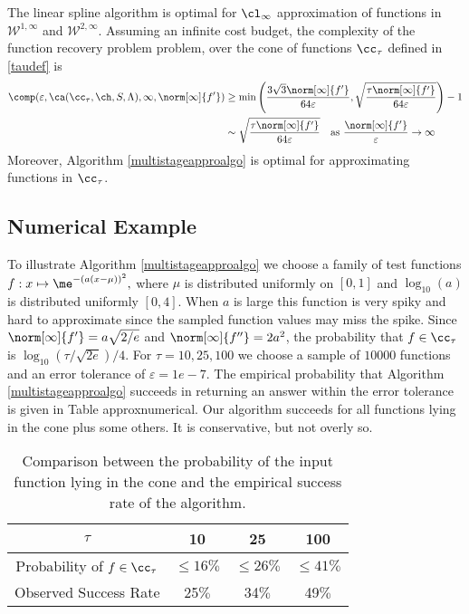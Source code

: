 \begin{theorem} \label{complowbdappr} The linear spline algorithm is optimal for $\cl_{\infty}$ approximation of functions in $\mathcal{W}^{1,\infty}$ and $\mathcal{W}^{2,\infty}$. Assuming an infinite cost budget, the complexity of the function recovery problem problem, over the cone of functions $\cc_{\tau}$ defined in \eqref{taudef} is
\begin{align*}
\comp(\varepsilon,\ca(\cc_{\tau},\ch,S,\Lambda),\infty,\norm[\infty]{f'})
&\ge \min\left(\frac{3\sqrt{3}\norm[\infty]{f'}}{64 \varepsilon}, \sqrt{\frac{\tau\norm[\infty]{f'}}{64\varepsilon}} \right)-1\\
& \sim \sqrt{\frac{\tau\norm[\infty]{f'}}{64\varepsilon}}  \quad\text{as } \frac{\norm[\infty]{f'}}{\varepsilon} \to \infty
\end{align*}
Moreover, Algorithm \ref{multistageapproalgo} is optimal for approximating functions in $\cc_{\tau}$.
\end{theorem}

\subsection{Numerical Example}

To illustrate Algorithm \ref{multistageapproalgo} we
choose a family of test functions $f:x \mapsto \me^{-(a(x-\mu))^2},$
where $\mu$ is distributed uniformly on $[0,1]$ and $\log_{10}(a)$ is distributed uniformly $[0,4]$.  When $a$ is large this function is very spiky and hard to approximate since the sampled function values may miss the spike.  Since $\norm[\infty]{f'}=a\sqrt{2/e}$ and $\norm[\infty]{f''}=2a^2$, the probability that $f \in \cc_{\tau}$ is $\log_{10}(\tau/\sqrt{2e})/4.$
For $\tau = 10, 25 , 100$ we choose a sample of  $10000$ functions and an error tolerance of  $\varepsilon = 1e-7$.  The empirical probability that Algorithm \ref{multistageapproalgo} succeeds in returning an answer within the error tolerance is given in Table {approxnumerical}.  Our algorithm succeeds for all functions lying in the cone plus some others.  It is conservative, but not overly so.
\begin{table}[h]
\centering
\begin{tabular}{cccc}
$\tau$ &  10 & 25 & 100\\
\toprule
Probability of $f \in \cc_\tau$ &  $\leq 16 \%$ &  $\leq 26 \%$  & $\leq 41 \%$ \\
Observed Success Rate & 25$\%$ &  34$\%$  & 49$\%$ \\
\end{tabular}
\caption{Comparison between the probability of the input function lying in the cone and the empirical success rate of the algorithm.  \label{approxnumerical}}
\end{table}




